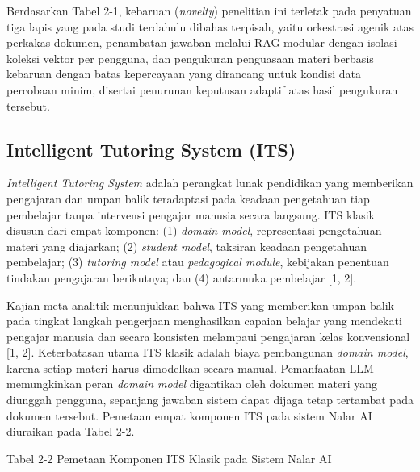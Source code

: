 \documentclass[12pt,a4paper]{article}
\begin{document}
Berdasarkan Tabel 2-1, kebaruan (\textit{novelty}) penelitian ini terletak pada penyatuan tiga lapis yang pada studi terdahulu dibahas terpisah, yaitu orkestrasi agenik atas perkakas dokumen, penambatan jawaban melalui RAG modular dengan isolasi koleksi vektor per pengguna, dan pengukuran penguasaan materi berbasis kebaruan dengan batas kepercayaan yang dirancang untuk kondisi data percobaan minim, disertai penurunan keputusan adaptif atas hasil pengukuran tersebut.



\subsection*{Intelligent Tutoring System (ITS)}

\textit{Intelligent Tutoring System} adalah perangkat lunak pendidikan yang memberikan pengajaran dan umpan balik teradaptasi pada keadaan pengetahuan tiap pembelajar tanpa intervensi pengajar manusia secara langsung. ITS klasik disusun dari empat komponen: (1) \textit{domain model}, representasi pengetahuan materi yang diajarkan; (2) \textit{student model}, taksiran keadaan pengetahuan pembelajar; (3) \textit{tutoring model} atau \textit{pedagogical module}, kebijakan penentuan tindakan pengajaran berikutnya; dan (4) antarmuka pembelajar {[}1, 2{]}.



Kajian meta-analitik menunjukkan bahwa ITS yang memberikan umpan balik pada tingkat langkah pengerjaan menghasilkan capaian belajar yang mendekati pengajar manusia dan secara konsisten melampaui pengajaran kelas konvensional {[}1, 2{]}. Keterbatasan utama ITS klasik adalah biaya pembangunan \textit{domain model}, karena setiap materi harus dimodelkan secara manual. Pemanfaatan LLM memungkinkan peran \textit{domain model} digantikan oleh dokumen materi yang diunggah pengguna, sepanjang jawaban sistem dapat dijaga tetap tertambat pada dokumen tersebut. Pemetaan empat komponen ITS pada sistem Nalar AI diuraikan pada Tabel 2-2.



Tabel 2-2	Pemetaan Komponen ITS Klasik pada Sistem Nalar AI
\end{document}
